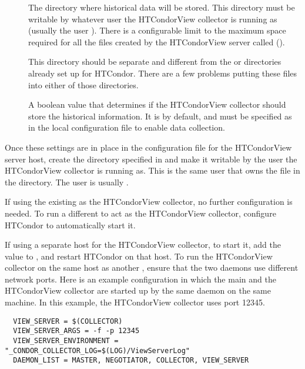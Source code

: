 \begin{description}

\item[] The directory where
historical data will be stored.
This directory must be writable by whatever user the HTCondorView
collector is running as (usually the user ).  
There is a configurable limit to the maximum space required for all
the files created by the HTCondorView server called
(). 

\Note This directory should be separate and different from the
 or  directories already set up for
HTCondor.
There are a few problems putting these files into either of those
directories.

\item[] A boolean value that determines
if the HTCondorView collector should store the historical information.
It is  by default, and must be specified as  in
the local configuration file to enable data collection.

\end{description}

Once these settings are in place in the configuration file for the
HTCondorView server host, create the directory specified
in  and make it writable by the user the
HTCondorView collector is running as.
This is the same user that owns the  file in
the  directory. The user is usually .

If using the existing  as the HTCondorView collector,
no further configuration is needed.  
To run a different
 to act as the HTCondorView collector, configure
HTCondor to automatically start it.

If using a separate host for the HTCondorView collector,
to start it, add the value  to
, and restart HTCondor on that host.
To run the HTCondorView collector on the same host as another 
,
ensure that the two  daemons use different network ports.
Here is an example configuration in which the main  and the
HTCondorView collector are started up by the same  daemon on
the same machine.  In this example, the HTCondorView collector uses
port 12345.

\footnotesize
\begin{verbatim}
  VIEW_SERVER = $(COLLECTOR)
  VIEW_SERVER_ARGS = -f -p 12345
  VIEW_SERVER_ENVIRONMENT = "_CONDOR_COLLECTOR_LOG=$(LOG)/ViewServerLog"
  DAEMON_LIST = MASTER, NEGOTIATOR, COLLECTOR, VIEW_SERVER
\end{verbatim}
\normalsize


